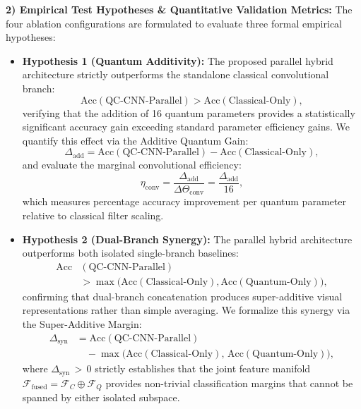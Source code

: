 \documentclass[pdflatex,sn-mathphys-num]{sn-jnl}%
\theoremstyle{thmstyleone}%
\theoremstyle{thmstyletwo}%
\theoremstyle{thmstylethree}%
\begin{document}
\textbf{2) Empirical Test Hypotheses \& Quantitative Validation Metrics:}
The four ablation configurations are formulated to evaluate three formal empirical hypotheses:
\begin{itemize}
    \item \textbf{Hypothesis 1 (Quantum Additivity):} The proposed parallel hybrid architecture strictly outperforms the standalone classical convolutional branch:
    \begin{equation}
    \mathrm{Acc}(\text{QC-CNN-Parallel}) > \mathrm{Acc}(\text{Classical-Only}),
    \label{eq:hyp_additivity}
    \end{equation}
    verifying that the addition of 16 quantum parameters provides a statistically significant accuracy gain exceeding standard parameter efficiency gains. We quantify this effect via the Additive Quantum Gain:
    \begin{equation}
    \Delta_{\mathrm{add}} = \mathrm{Acc}(\text{QC-CNN-Parallel}) - \mathrm{Acc}(\text{Classical-Only}),
    \label{eq:additive_gain_def}
    \end{equation}
    and evaluate the marginal convolutional efficiency:
    \begin{equation}
    \eta_{\mathrm{conv}} = \frac{\Delta_{\mathrm{add}}}{\Delta \Theta_{\mathrm{conv}}} = \frac{\Delta_{\mathrm{add}}}{16},
    \label{eq:param_efficiency_ratio}
    \end{equation}
    which measures percentage accuracy improvement per quantum parameter relative to classical filter scaling.

    \item \textbf{Hypothesis 2 (Dual-Branch Synergy):} The parallel hybrid architecture outperforms both isolated single-branch baselines:
    \begin{align}
    \mathrm{Acc}&(\text{QC-CNN-Parallel}) \nonumber \\
    &> \max\big(\mathrm{Acc}(\text{Classical-Only}), \mathrm{Acc}(\text{Quantum-Only})\big),
    \label{eq:hyp_synergy}
    \end{align}
    confirming that dual-branch concatenation produces super-additive visual representations rather than simple averaging. We formalize this synergy via the Super-Additive Margin:
    \begin{align}
    \Delta_{\mathrm{syn}} &= \mathrm{Acc}(\text{QC-CNN-Parallel}) \nonumber \\
    &\quad - \max\Big(\mathrm{Acc}(\text{Classical-Only}), \, \mathrm{Acc}(\text{Quantum-Only})\Big),
    \label{eq:synergy_margin_def}
    \end{align}
    where $\Delta_{\mathrm{syn}} \,{>}\, 0$ strictly establishes that the joint feature manifold $\mathcal{F}_{\mathrm{fused}} = \mathcal{F}_C \oplus \mathcal{F}_Q$ provides non-trivial classification margins that cannot be spanned by either isolated subspace.


\end{itemize}
\end{document}
